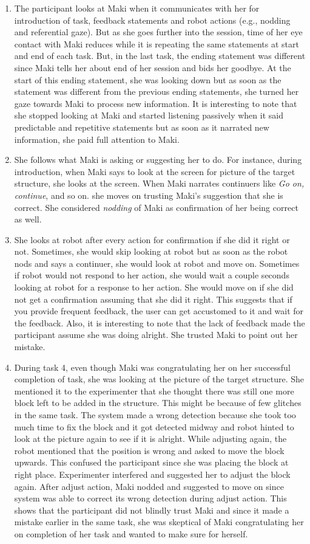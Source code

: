 \begin{enumerate}
    \item The participant looks at Maki when it communicates with her for introduction of task, feedback statements and robot actions (e.g., nodding and referential gaze). But as she goes further into the session, time of her eye contact with Maki reduces while it is repeating the same statements at start and end of each task. But, in the last task, the ending statement was different since Maki tells her about end of her session and bids her goodbye. At the start of this ending statement, she was looking down but as soon as the statement was different from the previous ending statements, she turned her gaze towards Maki to process new information. It is interesting to note that she stopped looking at Maki and started listening passively when it said predictable and repetitive statements but as soon as it narrated new information, she paid full attention to Maki. 
    \item She follows what Maki is asking or suggesting her to do. For instance, during introduction, when Maki says to look at the screen for picture of the target structure, she looks at the screen. When Maki narrates continuers like \emph{Go on, continue}, and so on. she moves on trusting Maki's suggestion that she is correct. She considered \emph{nodding} of Maki as confirmation of her being correct as well.
    \item She looks at robot after every action for confirmation if she did it right or not. Sometimes, she would skip looking at robot but as soon as the robot nods and says a continuer, she would look at robot and move on. Sometimes if robot would not respond to her action, she would wait a couple seconds looking at robot for a response to her action. She would move on if she did not get a confirmation assuming that she did it right. This suggests that if you provide frequent feedback, the user can get accustomed to it and wait for the feedback. Also, it is interesting to note that the lack of feedback made the participant assume she was doing alright. She trusted Maki to point out her mistake. 
    \item During task 4, even though Maki was congratulating her on her successful completion of task, she was looking at the picture of the target structure. She mentioned it to the experimenter that she thought there was still one more block left to be added in the structure.  This might be because of few glitches in the same task. The system made a wrong detection because she took too much time to fix the block and it got detected midway and robot hinted to look at the picture again to see if it is alright. While adjusting again, the robot mentioned that the position is wrong and asked to move the block upwards. This confused the participant since she was placing the block at right place. Experimenter interfered and suggested her to adjust the block again. After adjust action, Maki nodded and suggested to move on since system was able to correct its wrong detection during adjust action. This shows that the participant did not blindly trust Maki and since it made a mistake earlier in the same task, she was skeptical of Maki congratulating her on completion of her task and wanted to make sure for herself.

\end{enumerate}
